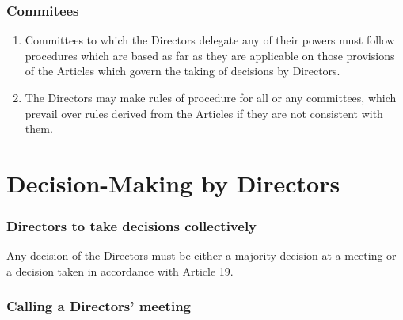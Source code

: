 \documentclass[a4paper,12pt]{article}
\begin{document}
\section{Commitees}

\begin{enumerate}
  \item Committees to which the Directors delegate any of their powers must follow procedures which are based as far as they are applicable on those provisions of the Articles which govern the taking of decisions by Directors.
  \item	The Directors may make rules of procedure for all or any committees, which prevail over rules derived from the Articles if they are not consistent with them.
\end{enumerate}

\part{Decision-Making by Directors}

\section{Directors to take decisions collectively}

Any decision of the Directors must be either a majority decision at a meeting or a decision taken in accordance with Article 19.

\section{Calling a Directors’ meeting}
\end{document}
